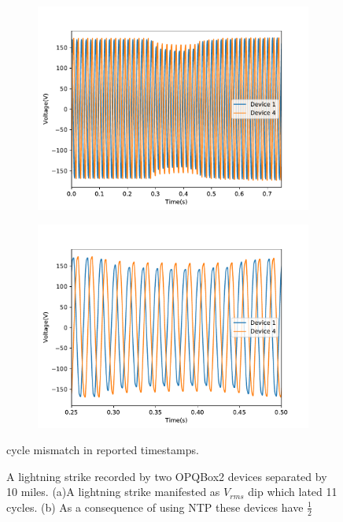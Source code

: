 \begin{figure}[h]
		\centering
	\begin{subfigure}{.5\textwidth}
	  \centering
	  \includegraphics[width=0.9\linewidth]{img/voltage_sag.pdf}
	  \caption{}
	  \label{fig6:sub1}
	\end{subfigure}%
	\begin{subfigure}{.5\textwidth}
	  \centering
	  \includegraphics[width=0.9\linewidth]{img/voltage_sag_zoomed_in.pdf}
	  \caption{}
	  \label{fig6:sub2}
	\end{subfigure}
	\caption{A lightning strike recorded by two OPQBox2 devices separated by 10 miles. (a)A lightning strike manifested as $V_{rms}$ dip which lated 11 cycles. (b) As a consequence of using NTP these devices have $\frac{1}{2}$} cycle mismatch in reported timestamps.
	\label{fig:6}
\end{figure}

